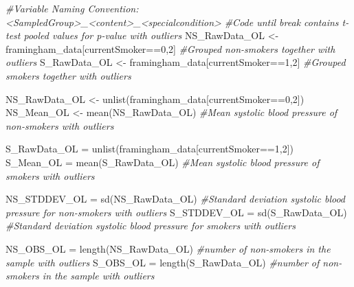 \documentclass[
]{article}
\newenvironment{Shaded}{\begin{snugshade}}{\end{snugshade}}
\newcommand{\CommentTok}[1]{\textcolor[rgb]{0.56,0.35,0.01}{\textit{#1}}}
\newcommand{\DecValTok}[1]{\textcolor[rgb]{0.00,0.00,0.81}{#1}}
\newcommand{\FunctionTok}[1]{\textcolor[rgb]{0.00,0.00,0.00}{#1}}
\newcommand{\NormalTok}[1]{#1}
\newcommand{\OtherTok}[1]{\textcolor[rgb]{0.56,0.35,0.01}{#1}}
\newcommand{\SpecialCharTok}[1]{\textcolor[rgb]{0.00,0.00,0.00}{#1}}
\begin{document}
\begin{Shaded}
\begin{Highlighting}[]
\CommentTok{\#Variable Naming Convention:  \textless{}SampledGroup\textgreater{}\_\textless{}content\textgreater{}\_\textless{}specialcondition\textgreater{}}
\CommentTok{\#Code until break contains t{-}test pooled values for p{-}value with outliers }
\NormalTok{NS\_RawData\_OL }\OtherTok{\textless{}{-}}\NormalTok{ framingham\_data[currentSmoker}\SpecialCharTok{==}\DecValTok{0}\NormalTok{,}\DecValTok{2}\NormalTok{] }\CommentTok{\#Grouped non{-}smokers together with outliers}
\NormalTok{S\_RawData\_OL }\OtherTok{\textless{}{-}}\NormalTok{ framingham\_data[currentSmoker}\SpecialCharTok{==}\DecValTok{1}\NormalTok{,}\DecValTok{2}\NormalTok{] }\CommentTok{\#Grouped smokers together with outliers}

\NormalTok{NS\_RawData\_OL }\OtherTok{\textless{}{-}} \FunctionTok{unlist}\NormalTok{(framingham\_data[currentSmoker}\SpecialCharTok{==}\DecValTok{0}\NormalTok{,}\DecValTok{2}\NormalTok{])}
\NormalTok{NS\_Mean\_OL }\OtherTok{\textless{}{-}} \FunctionTok{mean}\NormalTok{(NS\_RawData\_OL) }\CommentTok{\#Mean systolic blood pressure of non{-}smokers with outliers}

\NormalTok{S\_RawData\_OL }\OtherTok{=} \FunctionTok{unlist}\NormalTok{(framingham\_data[currentSmoker}\SpecialCharTok{==}\DecValTok{1}\NormalTok{,}\DecValTok{2}\NormalTok{])}
\NormalTok{S\_Mean\_OL }\OtherTok{=} \FunctionTok{mean}\NormalTok{(S\_RawData\_OL) }\CommentTok{\#Mean systolic blood pressure of smokers with outliers}

\NormalTok{NS\_STDDEV\_OL }\OtherTok{=} \FunctionTok{sd}\NormalTok{(NS\_RawData\_OL) }\CommentTok{\#Standard deviation systolic blood pressure for non{-}smokers with outliers}
\NormalTok{S\_STDDEV\_OL }\OtherTok{=} \FunctionTok{sd}\NormalTok{(S\_RawData\_OL) }\CommentTok{\#Standard deviation systolic blood pressure for smokers with outliers}

\NormalTok{NS\_OBS\_OL }\OtherTok{=} \FunctionTok{length}\NormalTok{(NS\_RawData\_OL) }\CommentTok{\#number of non{-}smokers in the sample with outliers}
\NormalTok{S\_OBS\_OL }\OtherTok{=} \FunctionTok{length}\NormalTok{(S\_RawData\_OL) }\CommentTok{\#number of non{-}smokers in the sample with outliers}


\end{Highlighting}
\end{Shaded}
\end{document}
